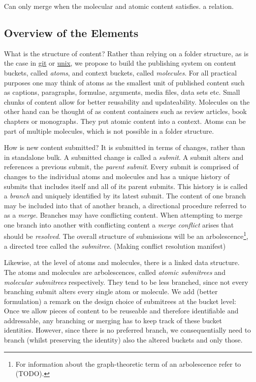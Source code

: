\documentclass[14pt]{article}
\newcommand{\remark}[1]{{\color{purple} (#1)}}
\begin{document}
Can only merge when the molecular and atomic content satisfies. a relation. 

\subsection{Overview of the Elements}


What is the structure of content? Rather than relying on a folder structure, as is the case in \href{https://git-scm.com/}{git}\cite{torwalds} or \href{https://en.wikipedia.org/wiki/Unix_filesystem}{unix}\cite{unix}, we propose to build the publishing system on content buckets, called \textit{atoms}, and context buckets, called \textit{molecules}. For all practical purposes one may think of atoms as the smallest unit of published content such as captions, paragraphs, formulae, arguments, media files, data sets etc. Small chunks of content allow for better reusability and updateability. Molecules on the other hand can be thought of as content containers such as review articles, book chapters or monographs. They put atomic content into a context. Atoms can be part of multiple molecules, which is not possible in a folder structure.

How is new content submitted? It is submitted in terms of changes, rather than in standalone bulk. A submitted change is called a \textit{submit}. 
A submit alters and references a previous submit, the \textit{parent submit}. Every submit is comprised of changes to the individual atoms and molecules and has a unique history of submits that includes itself and all of its parent submits. This history is is called a \textit{branch} and uniquely identified by its latest submit. The content of one branch may be included into that of another branch, a directional procedure referred to as a \textit{merge}. Branches may have conflicting content. When attempting to merge one branch into another with conflicting content a \textit{merge conflict} arises that should be \textit{resolved}. The overall structure of submissions will be an arbolescence\footnote{For information about the graph-theoretic term of an arbolescence refer to \remark{TODO}.}, a directed tree called the \textit{submitree}. 
\remark{Making conflict resolution manifest}

Likewise, at the level of atoms and molecules, there is a linked data structure. The atoms and molecules are arbolescences, called  \textit{atomic submitrees} and \textit{molecular submitrees} respectively. They tend to be less branched, since not every branching submit alters every single atom or molecule. We add \remark{better formulation} a remark on the design choice of submitrees at the bucket level:
Once we allow pieces of content to be reuseable and therefore identifiable and addressable, any branching or merging has to keep track of these bucket identities. However, since there is no preferred branch, we consequentially need to branch (whilst preserving the identity) also the altered buckets and only those. 
\end{document}
